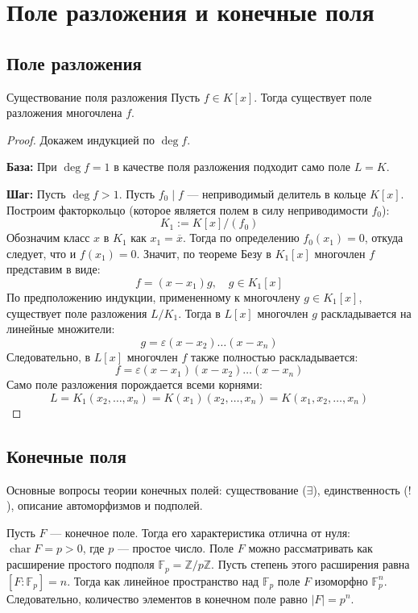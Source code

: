 
\section{Поле разложения и конечные поля}

\subsection{Поле разложения}

\begin{Theorem}{Существование поля разложения}{}
	Пусть $f \in K[x]$. Тогда существует поле разложения многочлена $f$.
\end{Theorem}

\begin{proof}
	Докажем индукцией по $\deg f$.
	
	\textbf{База:} При $\deg f = 1$ в качестве поля разложения подходит само поле $L = K$.
	
	\textbf{Шаг:} Пусть $\deg f > 1$. Пусть $f_0 \mid f$ --- неприводимый делитель в кольце $K[x]$. Построим факторкольцо (которое является полем в силу неприводимости $f_0$):
	\[ K_1 := K[x]/(f_0) \]
	Обозначим класс $x$ в $K_1$ как $x_1 = \overline{x}$. Тогда по определению $f_0(x_1) = 0$, откуда следует, что и $f(x_1) = 0$. Значит, по теореме Безу в $K_1[x]$ многочлен $f$ представим в виде:
	\[ f = (x - x_1)g, \quad g \in K_1[x] \]
	По предположению индукции, примененному к многочлену $g \in K_1[x]$, существует поле разложения $L/K_1$. Тогда в $L[x]$ многочлен $g$ раскладывается на линейные множители:
	\[ g = \varepsilon(x - x_2) \dots (x - x_n) \]
	Следовательно, в $L[x]$ многочлен $f$ также полностью раскладывается:
	\[ f = \varepsilon(x - x_1)(x - x_2) \dots (x - x_n) \]
	Само поле разложения порождается всеми корнями:
	\[ L = K_1(x_2, \dots, x_n) = K(x_1)(x_2, \dots, x_n) = K(x_1, x_2, \dots, x_n) \]
\end{proof}

\subsection{Конечные поля}

Основные вопросы теории конечных полей: существование ($\exists$), единственность ($!$), описание автоморфизмов и подполей.

Пусть $F$ --- конечное поле. Тогда его характеристика отлична от нуля: $\operatorname{char} F = p > 0$, где $p$ --- простое число. Поле $F$ можно рассматривать как расширение простого подполя $\mathbb{F}_p = \mathbb{Z}/p\mathbb{Z}$. 
Пусть степень этого расширения равна $[F : \mathbb{F}_p] = n$. Тогда как линейное пространство над $\mathbb{F}_p$ поле $F$ изоморфно $\mathbb{F}_p^n$. Следовательно, количество элементов в конечном поле равно $|F| = p^n$.

